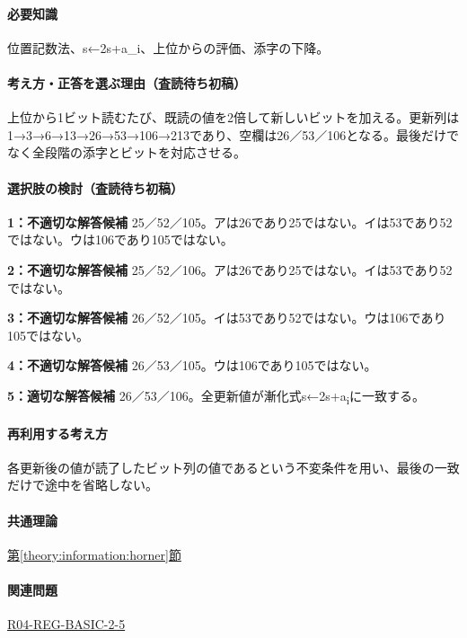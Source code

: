 \paragraph{必要知識} 位置記数法、s←2s+a\_i、上位からの評価、添字の下降。

\paragraph{考え方・正答を選ぶ理由（査読待ち初稿）} 上位から1ビット読むたび、既読の値を2倍して新しいビットを加える。更新列は1→3→6→13→26→53→106→213であり、空欄は26／53／106となる。最後だけでなく全段階の添字とビットを対応させる。

\paragraph{選択肢の検討（査読待ち初稿）}\mbox{}\par

\noindent\textbf{1：不適切な解答候補} 25／52／105。アは26であり25ではない。イは53であり52ではない。ウは106であり105ではない。\par

\noindent\textbf{2：不適切な解答候補} 25／52／106。アは26であり25ではない。イは53であり52ではない。\par

\noindent\textbf{3：不適切な解答候補} 26／52／105。イは53であり52ではない。ウは106であり105ではない。\par

\noindent\textbf{4：不適切な解答候補} 26／53／105。ウは106であり105ではない。\par

\noindent\textbf{5：適切な解答候補} 26／53／106。全更新値が漸化式s←2s+a\textsubscript{i}に一致する。\par

\paragraph{再利用する考え方} 各更新後の値が読了したビット列の値であるという不変条件を用い、最後の一致だけで途中を省略しない。

\paragraph{共通理論} \hyperref[theory:information:horner]{第\ref*{theory:information:horner}節}

\paragraph{関連問題} \hyperref[q:r04-reg-basic-2-5]{R04-REG-BASIC-2-5}

